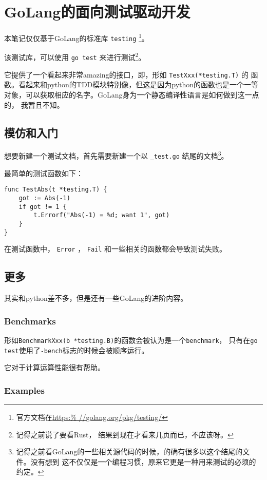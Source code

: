 
\section{GoLang的面向测试驱动开发}

\def\go{GoLang}
\def\ver|#1|{ \verb|#1| }

本笔记仅仅基于\go 的标准库\ver|testing|\footnote{官方文档在\url{https:%
//golang.org/pkg/testing/}}。

该测试库，可以使用\ver|go test|来进行测试\footnote{记得之前说了要看Rust，
结果到现在才看来几页而已，不应该呀。}。

它提供了一个看起来非常amazing的接口，即，形如\ver|TestXxx(*testing.T)|的
函数。看起来和python的TDD模块特别像，但这是因为python的函数也是一个一等
对象，可以获取相应的名字。\go 身为一个静态编译性语言是如何做到这一点的，
我暂且不知。

\subsection{模仿和入门}

想要新建一个测试文档，首先需要新建一个以\ver|_test.go|结尾的文档\footnote{%
记得之前看\go 的一些相关源代码的时候，的确有很多以这个结尾的文件。没有想到
这不仅仅是一个编程习惯，原来它更是一种用来测试的必须的约定。}。

最简单的测试函数如下：
\begin{lstlisting}
func TestAbs(t *testing.T) {
    got := Abs(-1)
    if got != 1 {
        t.Errorf("Abs(-1) = %d; want 1", got)
    }
}
\end{lstlisting}

在测试函数中，\ver|Error|，\ver|Fail|和一些相关的函数都会导致测试失败。

\subsection{更多}

其实和python差不多，但是还有一些\go 的进阶内容。

\subsubsection{Benchmarks}

形如\verb|BenchmarkXxx(b *testing.B)|的函数会被认为是一个\verb|benchmark|，
只有在\verb|go test|使用了\verb|-bench|标志的时候会被顺序运行。

它对于计算运算性能很有帮助。

\subsubsection{Examples}

